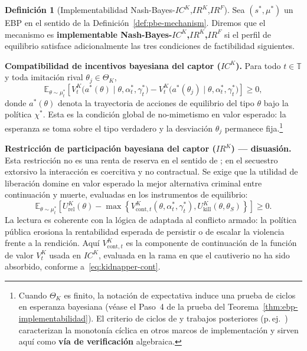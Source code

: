 \documentclass[12pt]{article}
\providecommand{\textcite}{\citet}
\theoremstyle{definition}
\newtheorem{definition}[theorem]{Definición}
\theoremstyle{remark}
\newcommand{\1}{\mathbf{1}}
\begin{document}
\begin{definition}[Implementabilidad Nash-Bayes-$IC^K$,$IR^K$,$IR^F$]
\label{def:implementable-mechanism}
Sea $(s^\ast,\mu^\ast)$ un EBP en el sentido de la Definición~\ref{def:pbe-mechanism}. Diremos que el mecanismo es \textbf{implementable Nash-Bayes-$IC^K$,$IR^K$,$IR^F$} si el perfil de equilibrio satisface adicionalmente las tres condiciones de factibilidad siguientes.

\smallskip
\noindent\textbf{Compatibilidad de incentivos bayesiana del captor \textup{(}$IC^K$\textup{)}.} Para todo $t\in\mathbb{T}$ y toda imitación rival $\theta_j\in\Theta_K$,
\[
\mathbb{E}_{\theta\sim\mu_t^\ast}
\left[
V^K_t\!\bigl(a^\ast(\theta)\mid \theta,\alpha_t^\ast,\gamma_t^\ast\bigr)
-
V^K_t\!\bigl(a^\ast(\theta_j)\mid \theta,\alpha_t^\ast,\gamma_t^\ast\bigr)
\right]
\ge 0,
\]
donde $a^\ast(\theta)$ denota la trayectoria de acciones de equilibrio del tipo $\theta$ bajo la política $\chi^\ast$. Esta es la condición global de no-mimetismo en valor esperado: la esperanza se toma sobre el tipo verdadero y la desviación $\theta_j$ permanece fija.\footnote{Cuando $\Theta_K$ es finito, la notación de expectativa induce una prueba de ciclos en esperanza bayesiana \textup{(}véase el Paso~4 de la prueba del Teorema~\ref{thm:ebp-implementabilidad}\textup{)}. El criterio de ciclos de \textcite{Rochet1987} y trabajos posteriores \textup{(}p.\,ej.\ \textcite{RochetChone1998}\textup{)} caracterizan la monotonía cíclica en otros marcos de implementación y sirven aquí como \textbf{vía de verificación} algebraica.}

\smallskip
\noindent\textbf{Restricción de participación bayesiana del captor \textup{(}$IR^K$\textup{)} --- disuasión.} Esta restricción no es una renta de reserva en el sentido de \textcite{Myerson1979IC}; en el secuestro extorsivo la interacción es coercitiva y no contractual. Se exige que la utilidad de liberación domine en valor esperado la mejor alternativa criminal entre continuación y muerte, evaluadas en los instrumentos de equilibrio:
\[
\mathbb{E}_{\theta\sim\mu_t^\ast}
\left[
U^K_{\mathrm{rel}}(\theta)
-
\max\left\{
V^K_{\mathrm{cont},t}(\theta,\alpha_t^\ast,\gamma_t^\ast),
U^K_{\mathrm{kill}}(\theta,\theta_S)
\right\}
\right]
\ge0.
\]
La lectura es coherente con la lógica de \textcite{Becker1968} adaptada al conflicto armado: la política pública erosiona la rentabilidad esperada de persistir o de escalar la violencia frente a la rendición. Aquí $V^K_{\mathrm{cont},t}$ es la componente de continuación de la función de valor $V^K_t$ usada en $IC^K$, evaluada en la rama en que el cautiverio no ha sido absorbido, conforme a~\eqref{eq:kidnapper-cont}.


\end{definition}
\end{document}
